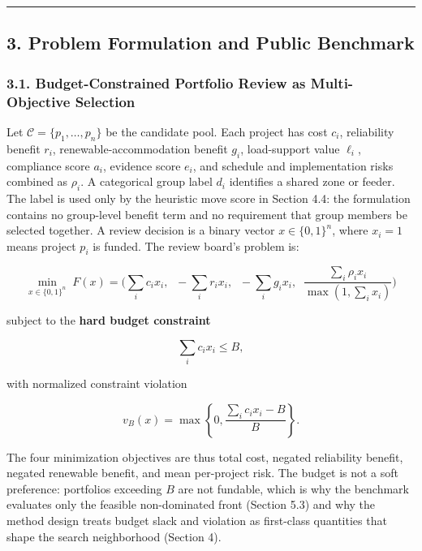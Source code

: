 \documentclass[
]{article}
\begin{document}
\begin{center}\rule{0.5\linewidth}{0.5pt}\end{center}

\subsection{3. Problem Formulation and Public Benchmark}\label{problem-formulation-and-public-benchmark}

\subsubsection{3.1. Budget-Constrained Portfolio Review as Multi-Objective Selection}\label{budget-constrained-portfolio-review-as-multi-objective-selection}

Let \(\mathcal{C} = \{p_1, \dots, p_n\}\) be the candidate pool. Each project has cost \(c_i\), reliability benefit \(r_i\), renewable-accommodation benefit \(g_i\), load-support value \(\ell_i\), compliance score \(a_i\), evidence score \(e_i\), and schedule and implementation risks combined as \(\rho_i\). A categorical group label \(d_i\) identifies a shared zone or feeder. The label is used only by the heuristic move score in Section 4.4: the formulation contains no group-level benefit term and no requirement that group members be selected together. A review decision is a binary vector \(x \in \{0,1\}^n\), where \(x_i = 1\) means project \(p_i\) is funded. The review board's problem is:

\[
\min_{x \in \{0,1\}^n} \; F(x) = \Big( \textstyle\sum_i c_i x_i, \;\; -\sum_i r_i x_i, \;\; -\sum_i g_i x_i, \;\; \frac{\sum_i \rho_i x_i}{\max(1, \sum_i x_i)} \Big)
\]

subject to the \textbf{hard budget constraint}

\[
\textstyle\sum_i c_i x_i \le B,
\]

with normalized constraint violation

\[
v_B(x)=\max\!\left\{0,\frac{\sum_i c_i x_i-B}{B}\right\}.
\]

The four minimization objectives are thus total cost, negated reliability benefit, negated renewable benefit, and mean per-project risk. The budget is not a soft preference: portfolios exceeding \(B\) are not fundable, which is why the benchmark evaluates only the feasible non-dominated front (Section 5.3) and why the method design treats budget slack and violation as first-class quantities that shape the search neighborhood (Section 4).
\end{document}
